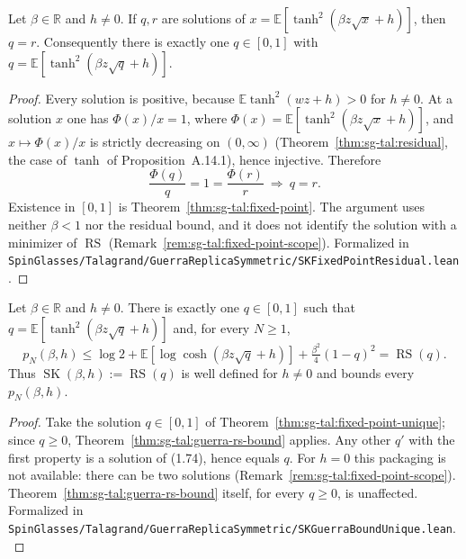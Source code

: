 \begin{theorem}\label{thm:sg-tal:fixed-point-unique}
  \leanok
{}
Let $\beta\in\mathbb R$ and $h\ne0$. If $q,r$ are solutions of $x=\mathbb{E}[\tanh^2(\beta z\sqrt x+h)]$, then $q=r$. Consequently there is exactly one $q\in[0,1]$ with
$q=\mathbb{E}[\tanh^2(\beta z\sqrt q+h)]$.
\end{theorem}
\begin{proof}
  \leanok
Every solution is positive, because $\mathbb{E}\tanh^2(wz+h)>0$ for $h\ne0$. At a solution $x$ one has $\Phi(x)/x=1$, where $\Phi(x)=\mathbb{E}[\tanh^2(\beta z\sqrt x+h)]$, and $x\mapsto\Phi(x)/x$ is strictly decreasing on $(0,\infty)$ (Theorem~\ref{thm:sg-tal:residual}, the case of $\tanh$ of Proposition~A.14.1), hence injective. Therefore
\[
\frac{\Phi(q)}q=1=\frac{\Phi(r)}r\ \Longrightarrow\ q=r .
\] Existence in $[0,1]$ is
Theorem~\ref{thm:sg-tal:fixed-point}. The argument uses neither $\beta<1$ nor the residual bound, and it does not identify the solution with a minimizer of $\operatorname{RS}$ (Remark~\ref{rem:sg-tal:fixed-point-scope}).
Formalized in \texttt{SpinGlasses/Talagrand/GuerraReplicaSymmetric/SKFixedPointResidual.lean}.
\end{proof}

\begin{theorem}\label{thm:sg-tal:guerra-rs-bound-unique}
  \leanok
{}
Let $\beta\in\mathbb R$ and $h\ne0$. There is exactly one $q\in[0,1]$ such that $q=\mathbb{E}[\tanh^2(\beta z\sqrt q+h)]$ and, for every $N\ge1$,
\[
p_N(\beta,h)\le \log 2+\mathbb{E}[\log\cosh(\beta z\sqrt q+h)]+\tfrac{\beta^2}{4}(1-q)^2=\operatorname{RS}(q).
\]
Thus $\operatorname{SK}(\beta,h):=\operatorname{RS}(q)$ is well defined for $h\ne0$ and bounds every $p_N(\beta,h)$.
\end{theorem}
\begin{proof}
  \leanok
Take the solution $q\in[0,1]$ of Theorem~\ref{thm:sg-tal:fixed-point-unique}; since $q\ge0$, Theorem~\ref{thm:sg-tal:guerra-rs-bound} applies. Any other $q'$ with the first property is a
solution of (1.74), hence equals $q$. For $h=0$ this packaging is not available: there can be two solutions (Remark~\ref{rem:sg-tal:fixed-point-scope}). Theorem~\ref{thm:sg-tal:guerra-rs-bound} itself, for
every $q\ge0$, is unaffected.
Formalized in \texttt{SpinGlasses/Talagrand/GuerraReplicaSymmetric/SKGuerraBoundUnique.lean}.
\end{proof}


